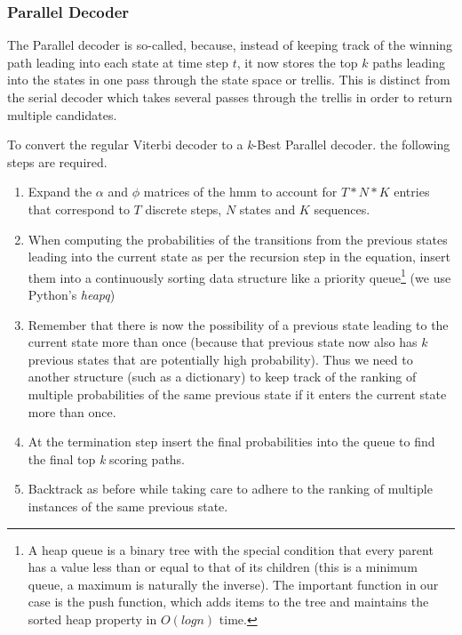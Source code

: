 {{{{{{{\subsubsection{Parallel Decoder}

The Parallel decoder \citep{Seshadri1994} is so-called, because, instead of keeping track of the winning path leading into each state at time step $t$, it now stores the top $k$ paths leading into the states in one pass through the state space or trellis. This is distinct from the serial decoder which takes several passes through the trellis in order to return multiple candidates.

To convert the regular Viterbi decoder to a \textit{k}-Best Parallel decoder. the following steps are required.

\begin{enumerate}
  \item Expand the $\alpha$ and $\phi$ matrices of the \acrshort{hmm} to account for $T*N*K$ entries that correspond to $T$ discrete steps, $N$ states and $K$ sequences.
  \item When computing the probabilities of the transitions from the previous states leading into the current state as per the recursion step in the equation, insert them into a continuously sorting data structure like a priority queue\footnote{ A heap queue is a binary tree with the special condition that every parent has a value less than or equal to that of its children (this is a minimum queue, a maximum is naturally the inverse). The important function in our case is the push function, which adds items to the tree and maintains the sorted heap property in $O(log n)$ time. } (we use Python's \textit{heapq})
  \item Remember that there is now the possibility of a previous state leading to the current state more than once (because that previous state now also has $k$ previous states that are potentially high probability). Thus we need to another structure (such as a dictionary) to keep track of the ranking of multiple probabilities of the same previous state if it enters the current state more than once.
  \item At the termination step insert the final probabilities into the queue to find the final top \textit{k} scoring paths.
  \item Backtrack as before while taking care to adhere to the ranking of multiple instances of the same previous state.
\end{enumerate}

}}}}}}}
